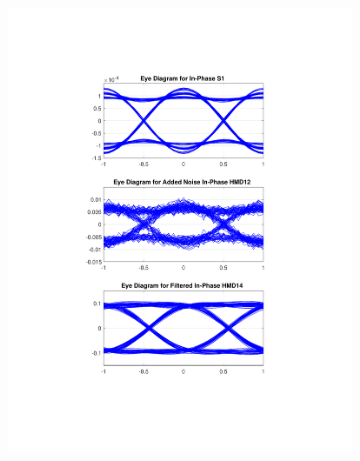 \begin{figure}[H]
	\centering
	\begin{subfigure}{.45\textwidth}
		\centering
		\includegraphics[clip, trim=5cm 4cm 5cm 4cm, width=\textwidth]{./sdf/m_qam_system/figures/eyes/if_p_45_09.pdf}
	\end{subfigure}
	\begin{subfigure}{.45\textwidth}
		\centering

\end{subfigure}
\end{figure}
